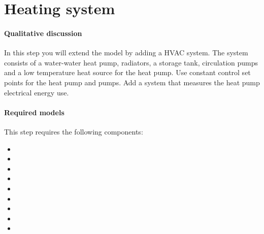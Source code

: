 \documentclass[10pt,a4paper]{article}
\begin{document}
\section{Heating system}
\paragraph{Qualitative discussion}
In this step you will extend the model  
by adding a HVAC system.
The system consists of a water-water heat pump, radiators, 
a storage tank,
circulation pumps and a low temperature heat source for the heat pump.
Use constant control set points for the heat pump and pumps.
Add a system that measures the heat pump electrical energy use.\\

\paragraph{Required models}
This step requires the following components:
\begin{itemize}
\item {}
\item {}
\item {}
\item {}
\item {}
\item {}
\item {}
\item {}
\item {}
\end{itemize}
\end{document}
